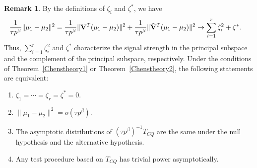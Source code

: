 \documentclass[3p]{elsarticle}
\theoremstyle{plain}
\newtheorem{theorem}{\quad\quad Theorem}
\theoremstyle{definition}
\newtheorem{remark}{\quad\quad Remark}
\theoremstyle{remark}
\begin{document}
\begin{remark}\label{remark1}
    By the definitions of $\zeta_i$ and $\zeta^*$, we have
    $$
    \begin{aligned}
        &\frac{1}{\tau p^{\beta}}\|\mu_1-\mu_2\|^2
    =
    \frac{1}{\tau p^{\beta}}\|\mathbf{V}^T (\mu_1-\mu_2)\|^2
        +
        \frac{1}{\tau p^{\beta}}\|\tilde{\mathbf{V}}^T (\mu_1-\mu_2)\|^2
    \to \sum_{i=1}^r \zeta_i^2+ \zeta^*.
    \end{aligned}
    $$
    Thus, $\sum_{i=1}^r\zeta_i^2$ and $\zeta^*$ characterize the signal strength in the principal subspace and the complement of the principal subspace, respectively.
    Under the conditions of Theorem~\ref{Chenstheory1} or Theorem~\ref{Chenstheory2}, the following statements are equivalent:
    \begin{enumerate}[(1)]
        \item
     $\zeta_1=\cdots=\zeta_r=\zeta^*=0$.
 \item
     $\|\mu_1-\mu_2\|^2=o(\tau p^{\beta})$.
         \item
            The asymptotic distributions of $(\tau p^{\beta})^{-1}T_{CQ}$ are the same under the null hypothesis and the alternative hypothesis.
        \item
            Any test procedure based on $T_{CQ}$ has trivial power asymptotically.
    \end{enumerate}
\end{remark}
\end{document}

